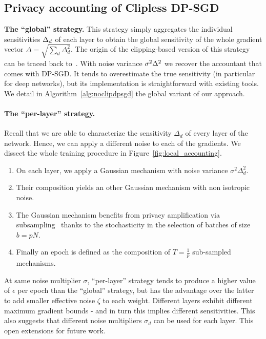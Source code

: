 \subsection{Privacy accounting of Clipless DP-SGD} \label{sec:cliplessSGD}

    \textbf{The ``global'' strategy.}
    This strategy simply aggregates the individual sensitivities $\Delta_d$ of each layer to obtain the global sensitivity of the whole gradient vector $\Delta=\sqrt{\sum_{d} \Delta_d^2}$. The origin of the clipping-based version of this strategy can be traced back to~\cite{mcmahanlearning}. With noise variance $\sigma^2\Delta^2$ we recover the accountant that comes with DP-SGD. It tends to overestimate the true sensitivity (in particular for deep networks), but its implementation is straightforward with existing tools. We detail in Algorithm~\ref{alg:noclipdpsgd} the global variant of our approach. 

    \paragraph{The ``per-layer'' strategy.} Recall that we are able to characterize the sensitivity $\Delta_d$ of every layer of the network. Hence, we can apply a different noise to each of the gradients. We dissect the whole training procedure in Figure~\ref{fig:local_accounting}.   
    \begin{enumerate}
        \item On each layer, we apply a Gaussian mechanism with noise variance $\sigma^2\Delta_d^2$. %
        \item Their composition yields an other Gaussian mechanism with non isotropic noise.
        \item The Gaussian mechanism benefits from privacy amplification via subsampling~\citep{balle2018privacy} thanks to the stochasticity in the selection of batches of size $b=pN$.
        \item Finally an epoch is defined as the composition of $T=\frac{1}{p}$ sub-sampled mechanisms.
    \end{enumerate}
     At same noise multiplier $\sigma$, ``per-layer'' strategy tends to produce a higher value of $\epsilon$ per epoch than the ``global'' strategy, but has the advantage over the latter to add smaller effective noise $\zeta$ to each weight.  Different layers exhibit different maximum gradient bounds - and in turn this implies different sensitivities. This also suggests that different noise multipliers $\sigma_d$ can be used for each layer. This open extensions for future work.  


